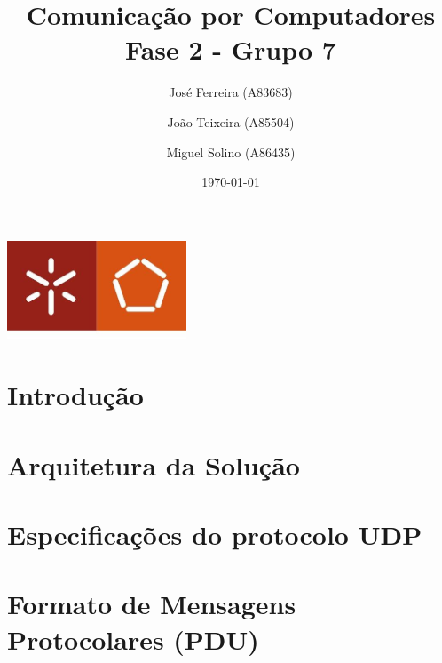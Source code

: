 \documentclass[a4paper]{report}
\begin{document}
\title{Comunicação por Computadores\\ 
\large Fase 2 - Grupo 7}
\author{José Ferreira (A83683) \and João Teixeira (A85504) \and Miguel Solino (A86435)}
\date{\today}

\begin{center}
    \begin{minipage}{0.75\linewidth}
        \centering
        \includegraphics[width=0.4\textwidth]{images/eng.jpeg}\par\vspace{1cm}
        \vspace{1.5cm}
        \href{https://www.uminho.pt/PT}
        {\color{black}{\scshape\LARGE Universidade do Minho}} \par
        \vspace{1cm}
        \href{https://www.di.uminho.pt/}
        {\color{black}{\scshape\Large Departamento de Informática}} \par
        \vspace{1.5cm}
        \maketitle
    \end{minipage}
\end{center}

\chapter{Introdução}

\chapter{Arquitetura da Solução}

\chapter{Especificações do protocolo UDP}
\chapter{Formato de Mensagens Protocolares (PDU)}
\end{document}
